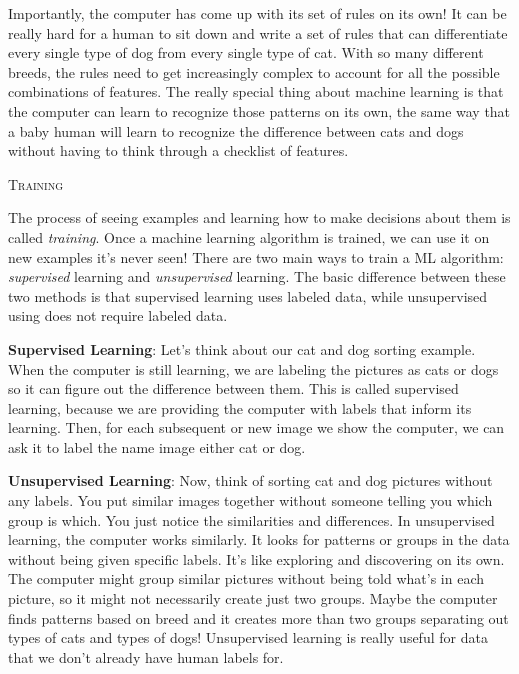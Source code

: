 Importantly, the computer has come up with its set of rules on its own! It can be really hard for a human to sit down and write a set of rules that can differentiate every single type of dog from every single type of cat. With so many different breeds, the rules need to get increasingly complex to account for all the possible combinations of features. The really special thing about machine learning is that the computer can learn to recognize those patterns on its own, the same way that a baby human will learn to recognize the difference between cats and dogs without having to think through a checklist of features. 

\vspace{15pt}

\textsc{Training}\\

\vspace{-1cm}

\strut\hrulefill

\vspace{5pt}

The process of seeing examples and learning how to make decisions about them is called \textit{training}. Once a machine learning algorithm is trained, we can use it on new examples it's never seen! There are two main ways to train a ML algorithm: \textit{supervised} learning and \textit{unsupervised} learning. The basic difference between these two methods is that supervised learning uses labeled data, while unsupervised using does not require labeled data.  

\textbf{Supervised Learning}: Let's think about our cat and dog sorting example. When the computer is still learning, we are labeling the pictures as cats or dogs so it can figure out the difference between them. This is called supervised learning, because we are providing the computer with labels that inform its learning. Then, for each subsequent or new image we show the computer, we can ask it to label the name image either cat or dog. 

\textbf{Unsupervised Learning}: Now, think of sorting cat and dog pictures without any labels. You put similar images together without someone telling you which group is which. You just notice the similarities and differences. In unsupervised learning, the computer works similarly. It looks for patterns or groups in the data without being given specific labels. It's like exploring and discovering on its own. The computer might group similar pictures without being told what's in each picture, so it might not necessarily create just two groups. Maybe the computer finds patterns based on breed and it creates more than two groups separating out types of cats and types of dogs! Unsupervised learning is really useful for data that we don't already have human labels for. 


